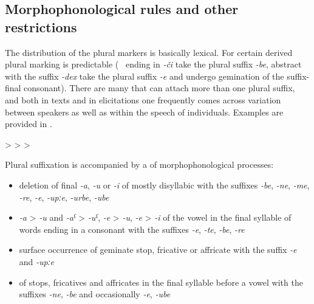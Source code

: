 \subsection{Morphophonological rules and other restrictions}
\label{ssec:MorphophonologicalrulesPluralA}
The distribution of the plural markers is basically lexical. For certain derived  plural marking is predictable (\teg\   ending in \textit{-či} take the plural suffix \textit{-be}, abstract  with the suffix \textit{-dex} take the plural suffix \textit{-e} and undergo gemination of the suffix-final consonant). There are many  that can attach more than one plural suffix, and both in texts and in elicitations one frequently comes across variation between speakers as well as within the speech of individuals. Examples are provided in .
%
\begin{exe}
\ex \label{ex:urcihorse}
\begin{xlist}
	\ex	{} 	>	 	 	
	\ex	{} 	>	 		
	\ex	{} 	>				
	\end{xlist}
\end{exe}

Plural suffixation is accompanied by a  of morphophonological processes:
%
\begin{itemize}
	\item	deletion of final \textit{-a}, \textit{-u} or \textit{-i} of mostly disyllabic  with the suffixes \textit{-be}, \textit{-ne}, \textit{-me}, \textit{-re}, \textit{-e}, \textit{-upːe}, \textit{-urbe}, \textit{-ube}
	\item	{} \textit{-a} > \textit{-u} and \textit{-aˁ} > \textit{-uˁ}, \textit{-e} > \textit{-u}, \textit{-e} > \textit{-i} of the vowel in the final syllable of words ending in a consonant with the suffixes \textit{-e}, \textit{-te}, \textit{-be}, \textit{-re} 
	\item	surface occurrence of geminate stop, fricative or affricate with the suffix \textit{-e} and \textit{-upːe}
	\item	{} of stops, fricatives and affricates in the final syllable before a vowel with the suffixes \textit{-ne}, \textit{-be} and occasionally \textit{-e}, \textit{-ube}
\end{itemize}

